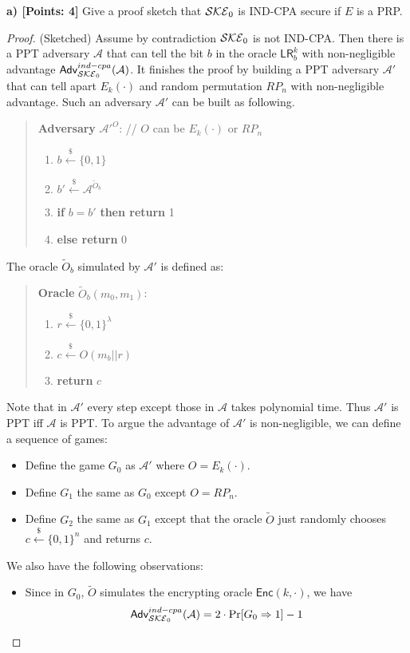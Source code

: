 \documentclass[12pt]{article}
\newcommand{\bits}{\{0,1\}}
\newcommand{\getsr}{\stackrel{\$}{\gets}}
\newcommand{\Adv}{\textsf{Adv}}
\theoremstyle{definition}
\newcommand{\Enc}{\textsf{Enc}}
\newcommand{\A}{\mathcal{A}}
\newcommand{\LR}{\textsf{LR}}
\begin{document}
{\bf a) [Points: 4]} Give a proof sketch that $\mathcal{SKE}_0$ is IND-CPA secure if $E$ is a PRP.
\begin{proof}
(Sketched) Assume by contradiction $\mathcal{SKE}_0$ is not IND-CPA. Then there is a PPT adversary $\A$ that can tell the bit $b$ in the oracle $\LR_b^k$ with non-negligible advantage $\Adv_{\SKE_0}^{ind-cpa}(\A)$. It finishes the proof by building a PPT adversary $\A'$ that can tell apart $E_k(\cdot)$ and random permutation $RP_{n}$ with non-negligible advantage. Such an adversary $\A'$ can be built as following.
\begin{quote}
{\bf Adversary} $\A'^{O}$: // $O$ can be $E_k(\cdot)$ or $RP_n$
\begin{enumerate}
\item $b \getsr \bits$
\item $b' \getsr \A^{\widetilde{O}_b}$
\item {\bf if} $b=b'$ {\bf then return} 1
\item {\bf else return} 0
\end{enumerate}
\end{quote}
The oracle $\widetilde{O}_b$ simulated by $\A'$ is defined as:
\begin{quote}
{\bf Oracle} $\widetilde{O}_b(m_0,m_1)$:
\begin{enumerate}
\item $r \getsr \bits^\lambda$
\item $c \getsr O(m_b || r)$
\item {\bf return} $c$
\end{enumerate}
\end{quote}
Note that in $\A'$ every step except those in $\A$ takes polynomial time. Thus $\A'$ is PPT iff $\A$ is PPT.
To argue the advantage of $\A'$ is non-negligible, we can define a sequence of games:
\begin{itemize}
\item Define the game $G_0$ as $\A'$ where $O = E_k(\cdot)$. 
\item Define $G_1$ the same as $G_0$ except $O=RP_n$. 
\item Define $G_2$ the same as $G_1$ except that the oracle $\widetilde{O}$ just randomly chooses $c \getsr \bits^n$ and returns $c$. 
\end{itemize}
We also have the following observations:
\begin{itemize}
\item Since in $G_0$, $\widetilde{O}$ simulates the encrypting oracle $\Enc(k,\cdot)$, we have
$$\Adv_{\SKE_0}^{ind-cpa}(\A) = 2\cdot\Pr[G_0 \Rightarrow 1] - 1$$

\end{itemize}
\end{proof}
\end{document}
